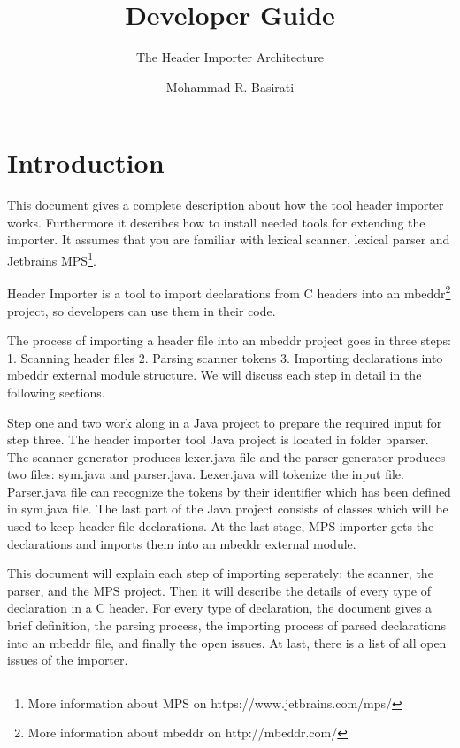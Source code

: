 \documentclass[titlepage]{article}
\title{Developer Guide}
\subtitle{The Header Importer Architecture}
\author{Mohammad R. Basirati}
\begin{document}
 
\maketitle
 
\tableofcontents
\newpage


\section{Introduction}
This document gives a complete description about how the tool header importer works. Furthermore it describes how to install needed tools for extending the importer. It assumes that you are familiar with lexical scanner, lexical parser and Jetbrains MPS\footnote{More information about MPS on https://www.jetbrains.com/mps/}.

Header Importer is a tool to import declarations from C headers into an mbeddr\footnote{More information about mbeddr on http://mbeddr.com/} project, so developers can use them in their code.

The process of importing a header file into an mbeddr project goes in three steps: 1. Scanning header files 2. Parsing scanner tokens 3. Importing declarations into mbeddr external module structure. We will discuss each step in detail in the following sections.

Step one and two work along in a Java project to prepare the required input for step three. The header importer tool Java project is located in folder bparser. The scanner generator produces lexer.java file and the parser generator produces two files: sym.java and parser.java. Lexer.java will tokenize the input file. Parser.java file can recognize the tokens by their identifier which has been defined in sym.java file. The last part of the Java project consists of classes which will be used to keep header file declarations. At the last stage, MPS importer gets the declarations and imports them into an mbeddr external module.

This document will explain each step of importing seperately: the scanner, the parser, and the MPS project. Then it will describe the details of every type of declaration in a C header. For every type of declaration, the document gives a brief definition, the parsing process, the importing process of parsed declarations into an mbeddr file, and finally the open issues. At last, there is a list of all open issues of the importer. 
\end{document}
